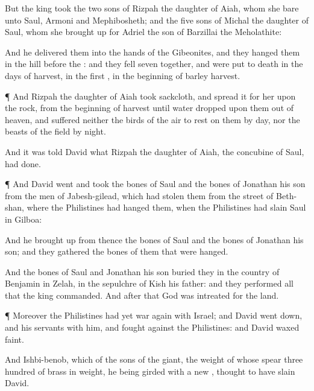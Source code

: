 {But the
king
took the
two
sons of
Rizpah the
daughter of
Aiah, whom she
bare unto
Saul,
Armoni and
Mephibosheth; and the
five
sons of
Michal the
daughter of
Saul, whom she brought
up for
Adriel the
son of
Barzillai the
Meholathite:

And he
delivered them into the
hands of the
Gibeonites, and they
hanged them in the
hill
before the
{}: and they
fell
{}
seven
together, and were put to
death in the
days of
harvest, in the
first
{}, in the
beginning of
barley
harvest.


\par }{\PP {}¶ And
Rizpah the
daughter of
Aiah
took
sackcloth, and
spread it for her upon the
rock, from the
beginning of
harvest until
water
dropped upon them out of
heaven, and
suffered neither the
birds of the
air to
rest on them by
day, nor the
beasts of the
field by
night.

And it was
told
David what
Rizpah the
daughter of
Aiah, the
concubine of
Saul, had
done.


\par }{\PP {}¶ And
David
went and
took the
bones of
Saul and the
bones of
Jonathan his
son from the
men of
Jabesh-gilead, which had
stolen them from the
street of
Beth-shan, where the
Philistines had
hanged them,
when the
Philistines had
slain
Saul in
Gilboa:

And he brought
up from thence the
bones of
Saul and the
bones of
Jonathan his
son; and they
gathered the
bones of them that were
hanged.

And the
bones of
Saul and
Jonathan his
son
buried they in the
country of
Benjamin in
Zelah, in the
sepulchre of
Kish his
father: and they
performed all that the
king
commanded. And
after that
God was
intreated for the
land.


\par }{\PP {}¶ Moreover the
Philistines had yet
war again with
Israel; and
David went
down, and his
servants with him, and
fought against the
Philistines: and
David waxed
faint.

And
Ishbi-benob, which
{} of the
sons of the
giant, the
weight of whose
spear
{}
three
hundred
{} of
brass in
weight, he being
girded with a
new
{},
thought to have
slain
David.

}
